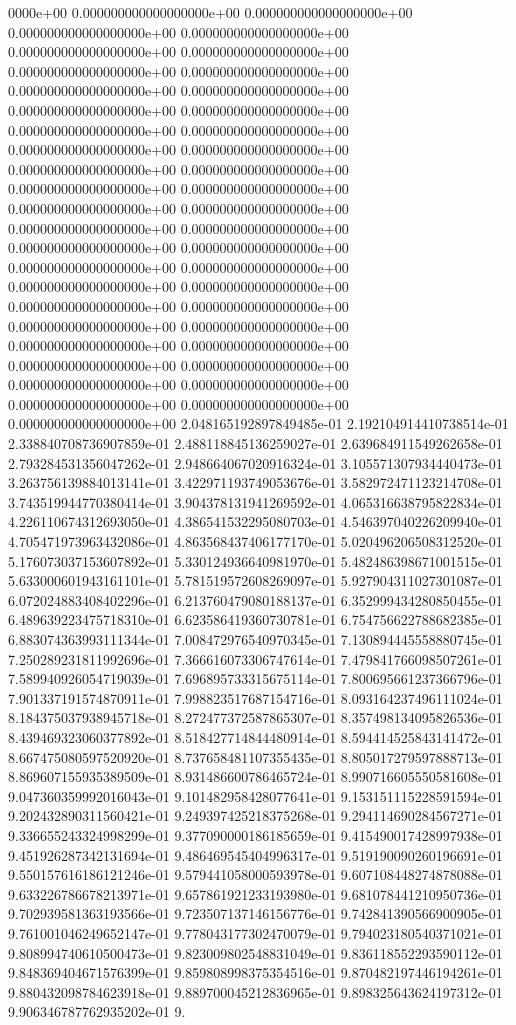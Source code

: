0000e+00	0.000000000000000000e+00	0.000000000000000000e+00	0.000000000000000000e+00	0.000000000000000000e+00	0.000000000000000000e+00	0.000000000000000000e+00	0.000000000000000000e+00	0.000000000000000000e+00	0.000000000000000000e+00	0.000000000000000000e+00	0.000000000000000000e+00	0.000000000000000000e+00	0.000000000000000000e+00	0.000000000000000000e+00	0.000000000000000000e+00	0.000000000000000000e+00	0.000000000000000000e+00	0.000000000000000000e+00	0.000000000000000000e+00	0.000000000000000000e+00	0.000000000000000000e+00	0.000000000000000000e+00	0.000000000000000000e+00	0.000000000000000000e+00	0.000000000000000000e+00	0.000000000000000000e+00	0.000000000000000000e+00	0.000000000000000000e+00	0.000000000000000000e+00	0.000000000000000000e+00	0.000000000000000000e+00	0.000000000000000000e+00	0.000000000000000000e+00	0.000000000000000000e+00	0.000000000000000000e+00	0.000000000000000000e+00	0.000000000000000000e+00	0.000000000000000000e+00	0.000000000000000000e+00	0.000000000000000000e+00	0.000000000000000000e+00	0.000000000000000000e+00	0.000000000000000000e+00	2.048165192897849485e-01	2.192104914410738514e-01	2.338840708736907859e-01	2.488118845136259027e-01	2.639684911549262658e-01	2.793284531356047262e-01	2.948664067020916324e-01	3.105571307934440473e-01	3.263756139884013141e-01	3.422971193749053676e-01	3.582972471123214708e-01	3.743519944770380414e-01	3.904378131941269592e-01	4.065316638795822834e-01	4.226110674312693050e-01	4.386541532295080703e-01	4.546397040226209940e-01	4.705471973963432086e-01	4.863568437406177170e-01	5.020496206508312520e-01	5.176073037153607892e-01	5.330124936640981970e-01	5.482486398671001515e-01	5.633000601943161101e-01	5.781519572608269097e-01	5.927904311027301087e-01	6.072024883408402296e-01	6.213760479080188137e-01	6.352999434280850455e-01	6.489639223475718310e-01	6.623586419360730781e-01	6.754756622788682385e-01	6.883074363993111344e-01	7.008472976540970345e-01	7.130894445558880745e-01	7.250289231811992696e-01	7.366616073306747614e-01	7.479841766098507261e-01	7.589940926054719039e-01	7.696895733315675114e-01	7.800695661237366796e-01	7.901337191574870911e-01	7.998823517687154716e-01	8.093164237496111024e-01	8.184375037938945718e-01	8.272477372587865307e-01	8.357498134095826536e-01	8.439469323060377892e-01	8.518427714844480914e-01	8.594414525843141472e-01	8.667475080597520920e-01	8.737658481107355435e-01	8.805017279597888713e-01	8.869607155935389509e-01	8.931486600786465724e-01	8.990716605550581608e-01	9.047360359992016043e-01	9.101482958428077641e-01	9.153151115228591594e-01	9.202432890311560421e-01	9.249397425218375268e-01	9.294114690284567271e-01	9.336655243324998299e-01	9.377090000186185659e-01	9.415490017428997938e-01	9.451926287342131694e-01	9.486469545404996317e-01	9.519190090260196691e-01	9.550157616186121246e-01	9.579441058000593978e-01	9.607108448274878088e-01	9.633226786678213971e-01	9.657861921233193980e-01	9.681078441210950736e-01	9.702939581363193566e-01	9.723507137146156776e-01	9.742841390566900905e-01	9.761001046249652147e-01	9.778043177302470079e-01	9.794023180540371021e-01	9.808994740610500473e-01	9.823009802548831049e-01	9.836118552293590112e-01	9.848369404671576399e-01	9.859808998375354516e-01	9.870482197446194261e-01	9.880432098784623918e-01	9.889700045212836965e-01	9.898325643624197312e-01	9.906346787762935202e-01	9.